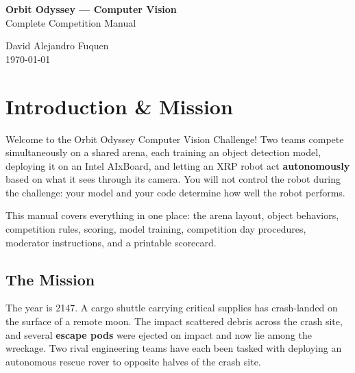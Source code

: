 \documentclass[a4]{article}
\begin{document}
\thispagestyle{fancy}

\begin{center}
    \textbf{\Large Orbit Odyssey --- Computer Vision} \\[4pt]
    {\large Complete Competition Manual}

    \vspace{0.7em}

    David Alejandro Fuquen \\

    {\small \today}

\end{center}

\section{Introduction \& Mission}

Welcome to the Orbit Odyssey Computer Vision Challenge! Two teams compete simultaneously on a shared arena, each training an object detection model, deploying it on an Intel AIxBoard, and letting an XRP robot act \textbf{autonomously} based on what it sees through its camera. You will not control the robot during the challenge: your model and your code determine how well the robot performs.

This manual covers everything in one place: the arena layout, object behaviors, competition rules, scoring, model training, competition day procedures, moderator instructions, and a printable scorecard.

\subsection*{The Mission}

The year is 2147. A cargo shuttle carrying critical supplies has crash-landed on the surface of a remote moon. The impact scattered debris across the crash site, and several \textbf{escape pods} were ejected on impact and now lie among the wreckage. Two rival engineering teams have each been tasked with deploying an autonomous rescue rover to opposite halves of the crash site.
\end{document}
